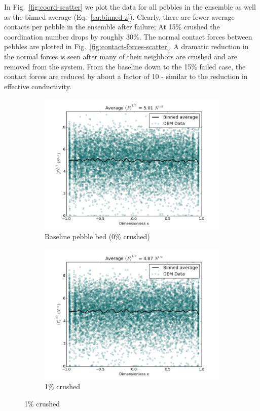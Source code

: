 In Fig.~\ref{fig:coord-scatter} we plot the data for all pebbles in the ensemble as well as the binned average (Eq.~\ref{eq:binned-z}). Clearly, there are fewer average contacts per pebble in the ensemble after failure; At 15\% crushed the coordination number drops by roughly 30\%. The normal contact forces between pebbles are plotted in Fig.~\ref{fig:contact-forces-scatter}. A dramatic reduction in the normal forces is seen after many of their neighbors are crushed and are removed from the system. From the baseline down to the 15\% failed case, the contact forces are reduced by about a factor of 10 - similar to the reduction in effective conductivity.


\begin{figure}[!ht]
    \centering
    \begin{subfigure}[b]{0.4\textwidth}
        \centering
        \includegraphics[width=\textwidth]{figures/heating_dte-02/0/dump/force-profile.png}
        \caption{Baseline pebble bed (0\% crushed)}
    \end{subfigure}
    \begin{subfigure}[b]{0.4\textwidth}
        \centering
        \includegraphics[width=\textwidth]{figures/heating_dte-02/1/dump/force-profile.png}
        \caption{1\% crushed}
    \end{subfigure}
    

\end{figure}
